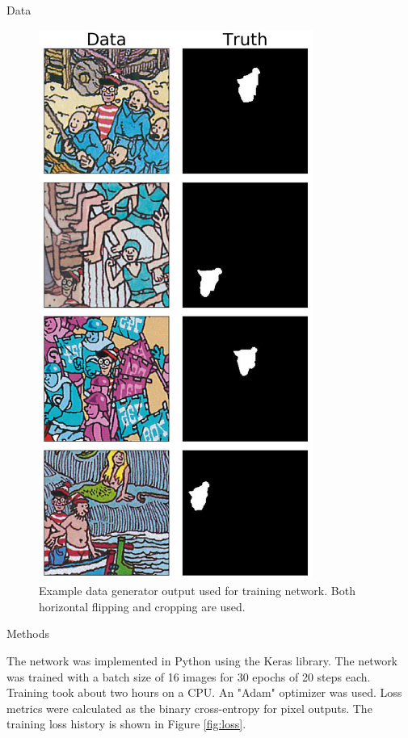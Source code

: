 \documentclass[final]{beamer}
\newlength{\onecolwid}
\begin{document}
\begin{frame}[t]
\begin{columns}[t]
\begin{column}{\onecolwid}
\begin{block}{Data}
\begin{figure}
    \centering
    \includegraphics[width=0.8\textwidth]{pictures/datagen.png}
    \caption{Example data generator output used for training network. Both horizontal flipping and cropping are used.}
    \label{fig:datagen}
\end{figure}




\end{block}



\begin{block}{Methods}

The network was implemented in Python using the Keras library. The network was trained with a batch size of 16 images for 30 epochs of 20 steps each. Training took about two hours on a CPU. An "Adam" optimizer was used. Loss metrics were calculated as the binary cross-entropy for pixel outputs. The training loss history is shown in Figure \ref{fig:loss}.








\end{block}
\end{column}
\end{columns}
\end{frame}
\end{document}
